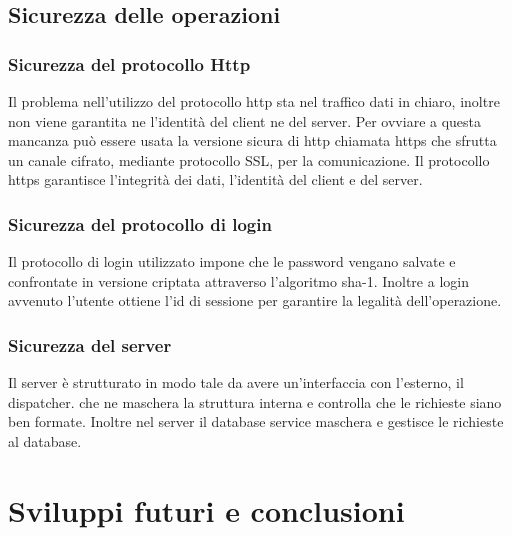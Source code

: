 \documentclass[12pt,a4]{article}
\begin{document}
\subsection{Sicurezza delle operazioni}
\subsubsection{Sicurezza del protocollo Http}
Il problema nell'utilizzo del protocollo http sta nel traffico dati in chiaro, inoltre non viene garantita ne l'identità del client ne del server. Per ovviare a questa mancanza può essere usata la versione sicura di http chiamata https che sfrutta un canale cifrato, mediante protocollo SSL, per la comunicazione. Il protocollo https garantisce l'integrità dei dati, l'identità del client e del server.

\subsubsection{Sicurezza del protocollo di login}
Il protocollo di login utilizzato impone che le password vengano salvate e confrontate in versione criptata attraverso l'algoritmo sha-1. Inoltre a login avvenuto l'utente ottiene l'id di sessione per garantire la legalità dell'operazione. 

\subsubsection{Sicurezza del server}
Il server è strutturato in modo tale da avere un'interfaccia con l'esterno, il dispatcher. che ne maschera la struttura interna e controlla che le richieste siano ben formate. Inoltre nel server il database service maschera e gestisce le richieste al database.

\section{Sviluppi futuri e conclusioni}
\end{document}
